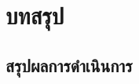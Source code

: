 \documentclass[11pt,a4paper]{article}
\begin{document}





\section{บทสรุป}
\subsection{สรุปผลการดำเนินการ}
\end{document}
